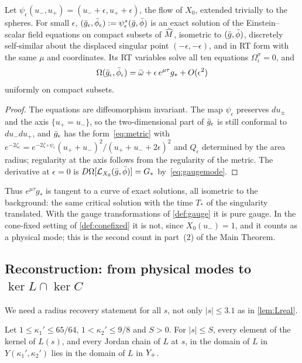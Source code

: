 \begin{lemma}\label{lem:cone}
Let $\psi_\epsilon(u_-,u_+)=(u_-+\epsilon,u_++\epsilon)$, the flow of $X_0$, extended trivially to the
spheres. For small $\epsilon$, $(\bar g_\epsilon,\bar\phi_\epsilon):=\psi_\epsilon^*(\bar g,\bar\phi)$ is an exact
solution of the Einstein--scalar field equations on compact subsets of $\widehat M$, isometric to
$(\bar g,\bar\phi)$, discretely self-similar about the displaced singular point $(-\epsilon,-\epsilon)$, and in RT
form with the same $\mu$ and coordinates. Its RT variables solve all ten equations $\Omega_i^\sigma=0$, and
\[
  \Omega(\bar g_\epsilon,\bar\phi_\epsilon)=\bar\omega+\epsilon\,e^{\mu\tau}g_*+O(\epsilon^2)
\]
uniformly on compact subsets.
\end{lemma}

\begin{proof}
The equations are diffeomorphism invariant. The map $\psi_\epsilon$ preserves $du_\pm$ and the axis
$\{u_+=u_-\}$, so the two-dimensional part of $\bar g_\epsilon$ is still conformal to $du_-du_+$, and
$\bar g_\epsilon$ has the form~\eqref{eq:metric} with $e^{-2\zeta_\epsilon}=e^{-2\zeta\circ\psi_\epsilon}
(u_++u_-)^2/(u_++u_-+2\epsilon)^2$ and $Q_\epsilon$ determined by the area radius; regularity at the axis
follows from the regularity of the metric. The derivative at $\epsilon=0$ is
$D\Omega[\mathcal{L}_{X_0}(\bar g,\bar\phi)]=G_*$ by~\eqref{eq:gaugemode}.
\end{proof}

Thus $e^{\mu\tau}g_*$ is tangent to a curve of exact solutions, all isometric to the background: the same
critical solution with the time $T_*$ of the singularity translated. With the gauge transformations of
\cref{def:gauge} it is pure gauge. In the cone-fixed setting of \cref{def:conefixed} it is not, since $X_0(u_-)=1$, and it
counts as a physical mode; this is the second count in part~(2) of the Main Theorem.

\subsection{Reconstruction: from physical modes to $\ker L\cap\ker C$}\label{sec:physical-forward}

We need a radius recovery statement for all $s$, not only $|s|\le3.1$ as in \cref{lem:Lreal}.

\begin{lemma}\label{lem:recovery}
Let $1\le\kappa_1'\le65/64$, $1<\kappa_2'\le9/8$ and $S>0$. For $|s|\le S$, every element of the kernel of
$L(s)$, and every Jordan chain of $L$ at $s$, in the domain of $L$ in $Y(\kappa_1',\kappa_2')$ lies in the
domain of $L$ in $Y_{+}$.
\end{lemma}

